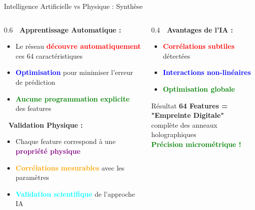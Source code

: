 \documentclass[aspectratio=169]{beamer}
\begin{document}
\begin{frame}{Intelligence Artificielle vs Physique : Synthèse}
    \begin{columns}
        \begin{column}{0.6\textwidth}
            \textbf{🧠 Apprentissage Automatique :}
            \begin{itemize}
                \item Le réseau \textcolor{red}{\textbf{découvre automatiquement}} ces 64 caractéristiques
                \item \textcolor{blue}{\textbf{Optimisation}} pour minimiser l'erreur de prédiction
                \item \textcolor{green}{\textbf{Aucune programmation explicite}} des features
            \end{itemize}

            \vspace{0.3cm}
            \textbf{🔬 Validation Physique :}
            \begin{itemize}
                \item Chaque feature correspond à une \textcolor{purple}{\textbf{propriété physique}}
                \item \textcolor{orange}{\textbf{Corrélations mesurables}} avec les paramètres
                \item \textcolor{cyan}{\textbf{Validation scientifique}} de l'approche IA
            \end{itemize}
        \end{column}
        \begin{column}{0.4\textwidth}
            \textbf{🎯 Avantages de l'IA :}
            \begin{itemize}
                \item \textcolor{red}{\textbf{Corrélations subtiles}} détectées
                \item \textcolor{blue}{\textbf{Interactions non-linéaires}}
                \item \textcolor{green}{\textbf{Optimisation globale}}
            \end{itemize}

            \vspace{0.3cm}
            \begin{alertblock}{Résultat}
                \textbf{64 Features = "Empreinte Digitale"} \\
                complète des anneaux holographiques \\
                \textcolor{green}{\textbf{Précision micrométrique !}}
            \end{alertblock}
        \end{column}
    \end{columns}
\end{frame}
\end{document}
